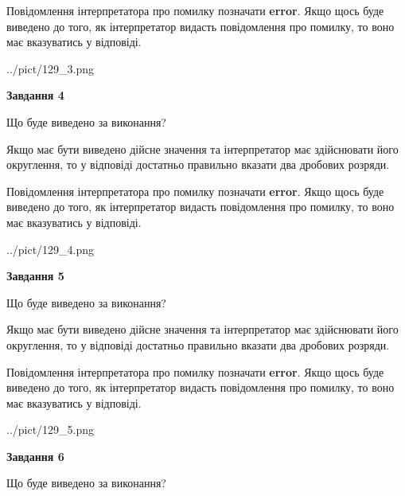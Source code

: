 \documentclass[12pt, ukrainian]{article}
\begin{document}
{\begin {Large}
Повідомлення інтерпретатора про помилку позначати \textbf{error}.
Якщо щось буде виведено до того, як інтерпретатор видасть повідомлення про помилку, 
то воно має вказуватись у відповіді. \par

\begin{center}
	{../pict/129_3.png}
\end{center}
\newpage

{\begin {center}\textbf{Завдання 4}\end {center}}\par
Що буде виведено за виконання? \par

Якщо має бути виведено дійсне значення та інтерпретатор має здійснювати його округлення, 
то у відповіді достатньо правильно вказати два дробових розряди.

Повідомлення інтерпретатора про помилку позначати \textbf{error}.
Якщо щось буде виведено до того, як інтерпретатор видасть повідомлення про помилку, 
то воно має вказуватись у відповіді. \par

\begin{center}
	{../pict/129_4.png}
\end{center}
\newpage

{\begin {center}\textbf{Завдання 5}\end {center}}\par
Що буде виведено за виконання? \par

Якщо має бути виведено дійсне значення та інтерпретатор має здійснювати його округлення, 
то у відповіді достатньо правильно вказати два дробових розряди.

Повідомлення інтерпретатора про помилку позначати \textbf{error}.
Якщо щось буде виведено до того, як інтерпретатор видасть повідомлення про помилку, 
то воно має вказуватись у відповіді. \par

\begin{center}
	{../pict/129_5.png}
\end{center}
\newpage

{\begin {center}\textbf{Завдання 6}\end {center}}\par
Що буде виведено за виконання? \par


\end{Large}}
\end{document}
